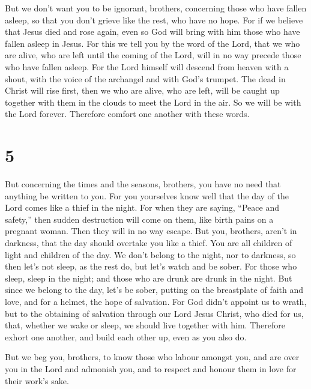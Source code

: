  But we don't want you to be ignorant, brothers,
concerning those who have fallen asleep, so that you don't grieve like
the rest, who have no hope.  For if we believe that Jesus
died and rose again, even so God will bring with him those who have
fallen asleep in Jesus.  For this we tell you by the word
of the Lord, that we who are alive, who are left until the coming of the
Lord, will in no way precede those who have fallen asleep.
 For the Lord himself will descend from heaven with a
shout, with the voice of the archangel and with God's trumpet. The dead
in Christ will rise first,  then we who are alive, who
are left, will be caught up together with them in the clouds to meet the
Lord in the air. So we will be with the Lord forever. 
Therefore comfort one another with these words.

\hypertarget{section-4}{%
\section{5}\label{section-4}}

 But concerning the times and the seasons, brothers, you
have no need that anything be written to you.  For you
yourselves know well that the day of the Lord comes like a thief in the
night.  For when they are saying, ``Peace and safety,''
then sudden destruction will come on them, like birth pains on a
pregnant woman. Then they will in no way escape.  But you,
brothers, aren't in darkness, that the day should overtake you like a
thief.  You are all children of light and children of the
day. We don't belong to the night, nor to darkness,  so
then let's not sleep, as the rest do, but let's watch and be sober.
 For those who sleep, sleep in the night; and those who
are drunk are drunk in the night.  But since we belong to
the day, let's be sober, putting on the breastplate of faith and love,
and for a helmet, the hope of salvation.  For God didn't
appoint us to wrath, but to the obtaining of salvation through our Lord
Jesus Christ,  who died for us, that, whether we wake or
sleep, we should live together with him.  Therefore
exhort one another, and build each other up, even as you also do.

 But we beg you, brothers, to know those who labour
amongst you, and are over you in the Lord and admonish you,
 and to respect and honour them in love for their work's
sake.

